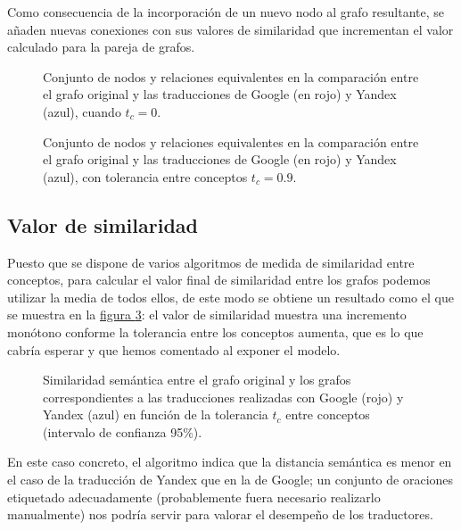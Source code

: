 \documentclass[a4paper,12pt,spanish]{book}
\begin{document}
Como consecuencia de la incorporación de un nuevo nodo al grafo resultante,
se añaden nuevas conexiones con sus valores de similaridad que incrementan
el valor calculado para la pareja de grafos.
\begin{figure}[htbp]
\centering
\capstart

\caption{Conjunto de nodos y relaciones equivalentes en la comparación entre el grafo original y las traducciones de Google (en rojo) y Yandex (azul), cuando \(t_c = 0\).}\label{5.pruebas/index:sample03-sussna-synset-tol-0}\end{figure}
\begin{figure}[htbp]
\centering
\capstart

\caption{Conjunto de nodos y relaciones equivalentes en la comparación entre el grafo original y las traducciones de Google (en rojo) y Yandex (azul), con tolerancia entre conceptos \(t_c = 0.9\).}\label{5.pruebas/index:id13}\end{figure}


\subsection{Valor de similaridad}
\label{5.pruebas/index:valor-de-similaridad}
Puesto que se dispone de varios algoritmos de medida de similaridad entre conceptos,
para calcular el valor final de similaridad entre los grafos podemos utilizar la media
de todos ellos, de este modo se obtiene un resultado como el que se muestra en la
\hyperref[5.pruebas/index:sample03-relation-tol-0]{figura  \ref*{5.pruebas/index:sample03-relation-tol-0}}: el valor de similaridad muestra una incremento
monótono conforme la tolerancia entre los conceptos aumenta, que es lo que cabría
esperar y que hemos comentado al exponer el modelo.
\begin{figure}[htbp]
\centering
\capstart

\caption{Similaridad semántica entre el grafo original y los grafos correspondientes a las traducciones realizadas con Google (rojo) y Yandex (azul) en función de la tolerancia \(t_c\) entre conceptos (intervalo de confianza 95\%).}\label{5.pruebas/index:sample03-relation-tol-0}\end{figure}

En este caso concreto, el algoritmo indica que la distancia semántica es menor en el
caso de la traducción de Yandex que en la de Google; un conjunto de oraciones
etiquetado adecuadamente (probablemente fuera necesario realizarlo manualmente)
nos podría servir para valorar el desempeño de los traductores.
\end{document}
